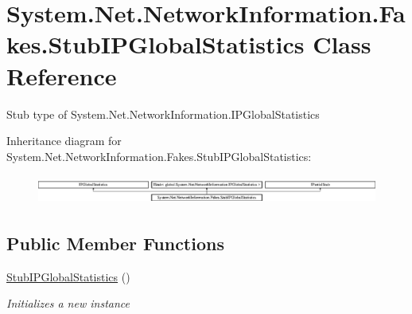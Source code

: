 \hypertarget{class_system_1_1_net_1_1_network_information_1_1_fakes_1_1_stub_i_p_global_statistics}{\section{System.\-Net.\-Network\-Information.\-Fakes.\-Stub\-I\-P\-Global\-Statistics Class Reference}
\label{class_system_1_1_net_1_1_network_information_1_1_fakes_1_1_stub_i_p_global_statistics}
}


Stub type of System.\-Net.\-Network\-Information.\-I\-P\-Global\-Statistics 


Inheritance diagram for System.\-Net.\-Network\-Information.\-Fakes.\-Stub\-I\-P\-Global\-Statistics\-:\begin{figure}[H]
\begin{center}
\leavevmode
\includegraphics[height=0.969697cm]{class_system_1_1_net_1_1_network_information_1_1_fakes_1_1_stub_i_p_global_statistics}
\end{center}
\end{figure}
\subsection*{Public Member Functions}
\begin{DoxyCompactItemize}
\item 
\hyperlink{class_system_1_1_net_1_1_network_information_1_1_fakes_1_1_stub_i_p_global_statistics_a1956d8c3bc0f1d43c2e2b3ec02cc20eb}{Stub\-I\-P\-Global\-Statistics} ()
\begin{DoxyCompactList}\small\item\em Initializes a new instance\end{DoxyCompactList}\end{DoxyCompactItemize}
